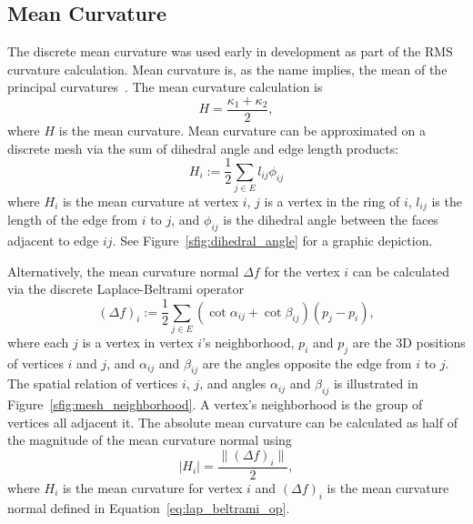 \subsection{Mean Curvature}\label{sec:mean_k}
The discrete mean curvature was used early in development as part of the RMS curvature calculation.
Mean curvature is, as the name implies, the mean of the principal curvatures~\cite{DDGAppIntro_19_discrete_k_2}.
The mean curvature calculation is
\begin{equation*}%
	H = \frac{\kappa_1 + \kappa_2}{2},
\end{equation*}
where $H$ is the mean curvature.
Mean curvature can be approximated on a discrete mesh via the sum of dihedral angle and edge length products:
\begin{equation}\label{eq:dihedral_angle}
	H_i := \frac{1}{2}\sum_{j \in E}l_{ij} \phi_{ij}
\end{equation}
where $H_i$ is the mean curvature at vertex $i$, $j$ is a vertex in the ring of $i$, $l_{ij}$ is the length of the edge from $i$ to $j$, and $\phi_{ij}$ is the dihedral angle between the faces adjacent to edge $ij$.
See Figure~\ref{sfig:dihedral_angle} for a graphic depiction.

Alternatively, the mean curvature normal $\Delta f$ for the vertex $i$ can be calculated via the discrete Laplace-Beltrami operator~\cite{DDGAppIntro_18_discrete_k_1}
\begin{equation}\label{eq:lap_beltrami_op}
	(\Delta f)_i := \frac{1}{2}\sum_{j \in E}(\cot \alpha_{ij} + \cot \beta_{ij})(p_j - p_i),
\end{equation}
where each $j$ is a vertex in vertex $i$'s neighborhood, $p_i$ and $p_j$ are the 3D positions of vertices $i$ and $j$, and $\alpha_{ij}$ and $\beta_{ij}$ are the angles opposite the edge from $i$ to $j$.
The spatial relation of vertices $i$, $j$, and angles $\alpha_{ij}$ and $\beta_{ij}$ is illustrated in Figure~\ref{sfig:mesh_neighborhood}.
A vertex's neighborhood is the group of vertices all adjacent it.
The absolute mean curvature can be calculated as half of the magnitude of the mean curvature normal using
\begin{equation*}
	|H_i| = \frac{\|(\Delta f)_i \|}{2},
\end{equation*}
where $H_i$ is the mean curvature for vertex $i$ and $(\Delta f)_i$ is the mean curvature normal defined in Equation~\eqref{eq:lap_beltrami_op}.

